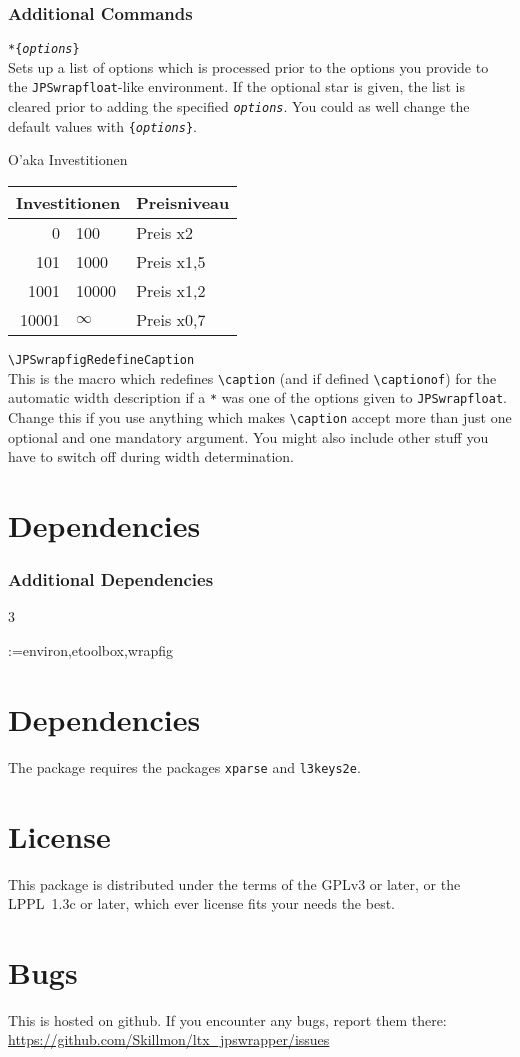 \documentclass[a4paper,10pt]{scrartcl}
\makeatletter
\newenvironment{codedescription*}{%
  \parindent=-3em
  \parskip=1em plus 2pt minus 2pt
  \vskip-\lastskip
  \hspace*{\parindent}\ignorespaces
}{\par}
\newcommand*\dependencies[2][3]{%
  \@ifstar
    {\section{Dependencies}}
    {\subsubsection{Additional Dependencies}}%
  \begin{multicols}{#1}
    \begin{itemize}%
      \@for\cs:={#2}\do{%
        \item\texttt{\cs}}%
    \end{itemize}%
  \end{multicols}}%
\makeatother
\begin{document}
\subsubsection{Additional Commands}
\begin{codedescription*}
\texttt{\string\JPSwrapfloatUserDefaults\textit{*}\{\textit{options}\}}\\
  Sets up a list of options which is processed prior to the options you provide
  to the \texttt{JPSwrapfloat}-like environment. If the optional star is given,
  the list is cleared prior to adding the specified \texttt{\textit{options}}.
  You could as well change the default values with
  \texttt{\string\JPSWrapperOptions[wrapfig]\{\textit{options}\}}.

\begin{JPSwrapfloat}[r,*]
  \vspace*{-5mm}%
  \centering
  \caption{O'aka Investitionen\label{tab:oaka}}%
  \begin{tabular}{r@{\,-\,}ll}
    \hline
    \multicolumn{2}{c}{Investitionen} & Preisniveau\\
    \hline
    0 & 100 & Preis x2\\
    101 & 1000 & Preis x1,5\\
    1001 & 10000 & Preis x1,2\\
    10001 & $\infty$ & Preis x0,7\\
    \hline
  \end{tabular}
\end{JPSwrapfloat}
\verb|\JPSwrapfigRedefineCaption|\\
  This is the macro which redefines \verb|\caption| (and if defined
  \verb|\captionof|) for the automatic width description if a \texttt{*} was one
  of the options given to \texttt{JPSwrapfloat}. Change this if you use anything
  which makes \verb|\caption| accept more than just one optional and one
  mandatory argument. You might also include other stuff you have to switch off
  during width determination.
\end{codedescription*}

\dependencies{environ,etoolbox,wrapfig}

\section{Dependencies}
The package requires the packages \texttt{xparse} and \texttt{l3keys2e}.

\section{License}
This package is distributed under the terms of the GPLv3 or later, or the
LPPL~1.3c or later, which ever license fits your needs the best.

\section{Bugs}
This is hosted on github. If you encounter any bugs, report them there:
\url{https://github.com/Skillmon/ltx_jpswrapper/issues}
\end{document}
